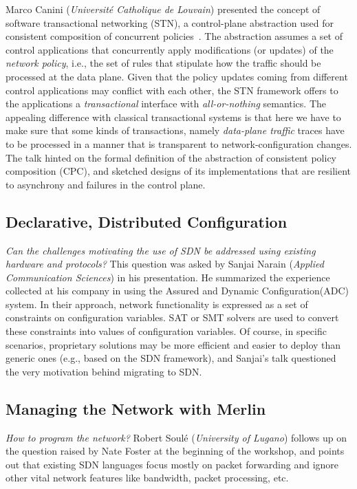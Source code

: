 \documentclass[11pt,pdftex,letter]{article}
\begin{document}
Marco Canini ({\em Universit\'{e} Catholique de Louvain}) presented the concept of software transactional
networking (STN), a control-plane abstraction used for consistent
composition of concurrent policies~\cite{stn}. The abstraction assumes a set of
control applications that concurrently apply modifications (or
updates) of the
\emph{network policy}, i.e., the set of rules that stipulate how the
traffic should be processed at the data plane.
Given that the policy updates coming from different control applications may
conflict with each other, the STN framework offers to the applications
a \emph{transactional} interface with \emph{all-or-nothing} semantics.
The appealing difference with classical transactional systems is that
here we have to make sure that some kinds of transactions, namely
\emph{data-plane traffic} traces have to be processed in a manner that
is transparent to network-configuration changes.
The talk hinted on the formal definition of the abstraction of consistent policy
composition (CPC), and sketched designs of its implementations that
are resilient to asynchrony and failures in the control plane.

\subsection{Declarative, Distributed Configuration}

\emph{Can the challenges motivating the use of SDN be addressed using
existing hardware and protocols?} This question was  asked
by Sanjai Narain ({\em Applied Communication Sciences}) in his presentation.
He
summarized the
experience collected at his company in using the Assured and Dynamic
Configuration(ADC) system. In their approach, network functionality is
expressed as a set of constraints on configuration variables. SAT or
SMT solvers are used to convert these constraints into values of configuration variables.
Of course, in specific scenarios, proprietary solutions may be more
efficient and  easier to deploy than generic ones (e.g., based on the
SDN framework), and Sanjai's talk questioned the very
motivation behind migrating to SDN.

\subsection{Managing the Network with Merlin}

\emph{How to program the network?} Robert Soul\'{e} ({\em University
  of Lugano}) follows up on the question raised by Nate Foster
at the beginning of the workshop, and points out that
existing SDN languages focus mostly
on packet forwarding and
ignore other vital network features like
bandwidth, packet processing, etc.
\end{document}
